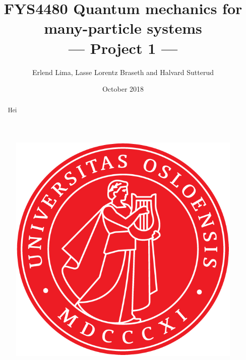 \documentclass[10pt]{article}
\begin{document}
\title{FYS4480 Quantum mechanics for many-particle systems \\
--- Project 1 ---}

\author{Erlend Lima, Lasse Lorentz Braseth and Halvard Sutterud}
\date{October 2018}
\maketitle{\begin{center}\end{center}}


\thispagestyle{empty}

\begin{figure}[htpb]
    \centering
    \includegraphics[width=0.9\linewidth]{../figures/UiO_Segl_300dpi.png}
    \label{fig:name}
\end{figure}


\newpage

\begin{abstract}
    Hei
\end{abstract}
    
\end{document}
